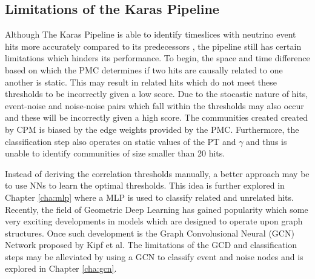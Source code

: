 \subsection{Limitations of the Karas Pipeline}
\label{sec:karas-pipeline-limitations}

Although The Karas Pipeline is able to identify timeslices with
neutrino event hits more accurately compared to its predecessors
\cite{karas2019data}, the pipeline still has certain limitations which
hinders its performance. To begin, the space and time difference based
on which the PMC determines if two hits are causally related to one
another is static. This may result in related hits which do not meet
these thresholds to be incorrectly given a low score. Due to the
stocastic nature of hits, event-noise and noise-noise pairs which fall
within the thresholds may also occur and these will be incorrectly
given a high score. The communities created created by CPM is biased
by the edge weights provided by the PMC. Furthermore, the
classification step also operates on static values of the PT and
$\gamma$ and thus is unable to identify communities of size smaller
than 20 hits.

Instead of deriving the correlation thresholds manually, a better
approach may be to use NNs to learn the optimal thresholds. This idea
is further explored in Chapter \ref{cha:mlp} where a MLP is used to
classify related and unrelated hits. Recently, the field of Geometric
Deep Learning has gained popularity which some very exciting
developments in models which are designed to operate upon graph
structures. Once such development is the Graph Convolusional Neural
(GCN) Network proposed by Kipf et al. The limitations of the GCD and
classification steps may be alleviated by using a GCN to classify
event and noise nodes and is explored in Chapter \ref{cha:gcn}.
